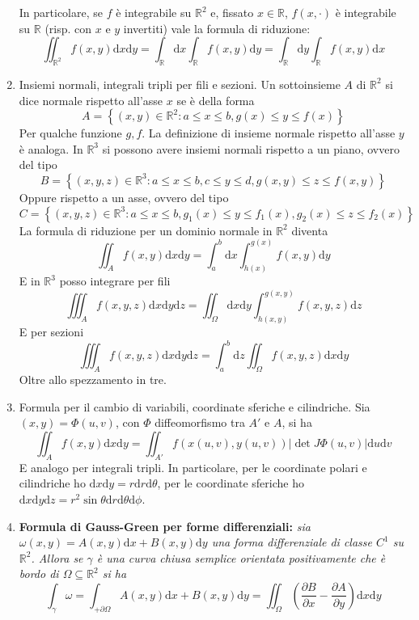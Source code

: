 \documentclass[a4paper,11pt]{article}
\begin{document}
\begin{enumerate}
	In particolare, se $f$ è integrabile su $\mathbb{R}^2$ e, fissato $x\in\mathbb{R}$, $f(x,\cdot)$ è integrabile su $\mathbb{R}$ (risp. con $x$ e $y$ invertiti) vale la formula di riduzione:
	\[\iint_{\mathbb{R}^2}f(x,y)\mathrm{d}x\mathrm{d}y=\int_{\mathbb{R}}\mathrm{d}x\int_{\mathbb{R}}f(x,y)\mathrm{d}y=\int_{\mathbb{R}}\mathrm{d}y\int_{\mathbb{R}}f(x,y)\mathrm{d}x\]
	
	\item Insiemi normali, integrali tripli per fili e sezioni.
	Un sottoinsieme $A$ di $\mathbb{R}^2$ si dice normale rispetto all'asse $x$ se è della forma
	\[A=\left\{(x,y)\in\mathbb{R}^2:a\leq x\leq b, g(x)\leq y\leq f(x)\right\}\]
	Per qualche funzione $g,f$. La definizione di insieme normale rispetto all'asse $y$ è analoga. In $\mathbb{R}^3$ si possono avere insiemi normali rispetto a un piano, ovvero del tipo
	\[B=\left\{(x,y,z)\in\mathbb{R}^3:a\leq x\leq b,c\leq y\leq d, g(x,y)\leq z\leq f(x,y)\right\}\]
	Oppure rispetto a un asse, ovvero del tipo
	\[C=\left\{(x,y,z)\in\mathbb{R}^3:a\leq x\leq b, g_1(x)\leq y\leq f_1(x), g_2(x)\leq z\leq f_2(x)\right\}\]
	La formula di riduzione per un dominio normale in $\mathbb{R}^2$ diventa
	\[\iint_Af(x,y)\mathrm{d}x\mathrm{d}y=\int_{a}^{b}\mathrm{d}x\int_{h(x)}^{g(x)}f(x,y)\mathrm{d}y\]
	E in $\mathbb{R}^3$ posso integrare per fili
	\[\iiint_Af(x,y,z)\mathrm{d}x\mathrm{d}y\mathrm{d}z=\iint_{\Omega}\mathrm{d}x\mathrm{d}y\int_{h(x,y)}^{g(x,y)}f(x,y,z)\mathrm{d}z\]
	E per sezioni
	\[\iiint_Af(x,y,z)\mathrm{d}x\mathrm{d}y\mathrm{d}z=\int_{a}^{b}\mathrm{d}z\iint_{\Omega}f(x,y,z)\mathrm{d}x\mathrm{d}y\]
	Oltre allo spezzamento in tre.
	\item Formula per il cambio di variabili, coordinate sferiche e cilindriche.
	Sia $(x,y)=\Phi(u,v)$, con $\Phi$ diffeomorfismo tra $A'$ e $A$, si ha
	\[\iint_Af(x,y)\mathrm{d}x\mathrm{d}y=\iint_{A'}f(x(u,v),y(u,v))\left|\det J\Phi(u,v)\right|\mathrm{d}u\mathrm{d}v\]
	E analogo per integrali tripli.
	In particolare, per le coordinate polari e cilindriche ho $\mathrm{d}x\mathrm{d}y=r\mathrm{d}r\mathrm{d}\theta$, per le coordinate sferiche ho $\mathrm{d}x\mathrm{d}y\mathrm{d}z=r^2\sin\theta\mathrm{d}r\mathrm{d}\theta\mathrm{d}\phi$.
	\item \textbf{Formula di Gauss-Green per forme differenziali:} \textit{sia $\omega(x,y)=A(x,y)\mathrm{d}x+B(x,y)\mathrm{d}y$ una forma differenziale di classe $C^1$ su $\mathbb{R}^2$. Allora se $\gamma$ è una curva chiusa semplice orientata positivamente che è bordo di $\Omega\subseteq\mathbb{R}^2$ si ha
	\[\int_{\gamma}\omega=\int_{+\partial \Omega}A(x,y)\mathrm{d}x+B(x,y)\mathrm{d}y=\iint_{\Omega}\left(\frac{\partial B}{\partial x}-\frac{\partial A}{\partial y}\right)\mathrm{d}x\mathrm{d}y\]}
		

\end{enumerate}
\end{document}
